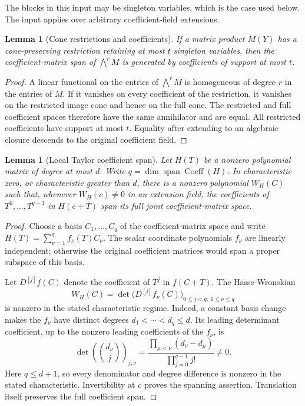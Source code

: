 \documentclass[11pt]{article}
\newtheorem{lemma}[theorem]{Lemma}
\begin{document}
The blocks in this input may be singleton variables, which is the case
used below. The input applies over arbitrary coefficient-field
extensions.

\begin{lemma}[Cone restrictions and coefficients]\label{lem:cone}
If a matrix product $M(Y)$ has a cone-preserving restriction retaining
at most $t$ singleton variables, then the coefficient-matrix span of
$\bigwedge^r M$ is generated by coefficients of support at most $t$.
\end{lemma}
\begin{proof}
A linear functional on the entries of $\bigwedge^r M$ is homogeneous
of degree $r$ in the entries of $M$. If it vanishes on every coefficient
of the restriction, it vanishes on the restricted image cone and hence
on the full cone. The restricted and full coefficient spaces therefore
have the same annihilator and are equal. All restricted coefficients
have support at most $t$. Equality after extending to an algebraic
closure descends to the original coefficient field.
\end{proof}

\begin{lemma}[Local Taylor coefficient span]\label{lem:jets}
Let $H(T)$ be a nonzero polynomial matrix of degree at most $d$.
Write $q=\dim\operatorname{span}\operatorname{Coeff}(H)$.
In characteristic zero, or characteristic greater than $d$, there is
a nonzero polynomial $W_H(C)$ such that, whenever $W_H(c)\ne0$
in an extension field,
the coefficients of $T^0,\ldots,T^{q-1}$ in $H(c+T)$ span its full
joint coefficient-matrix space.
\end{lemma}
\begin{proof}
Choose a basis $C_1,\ldots,C_q$ of the coefficient-matrix space and
write $H(T)=\sum_{\nu=1}^q f_\nu(T)C_\nu$. The scalar coordinate
polynomials $f_\nu$ are linearly independent; otherwise the original
coefficient matrices would span a proper subspace of this basis.

Let $D^{[j]}f(C)$ denote the coefficient of $T^j$ in $f(C+T)$.
The Hasse-Wronskian
\[
 W_H(C)=\det\bigl(D^{[j]}f_\nu(C)\bigr)_{
                  0\le j<q,\ 1\le\nu\le q}
\]
is nonzero in the stated characteristic regime. Indeed, a constant
basis change makes the $f_\nu$ have distinct degrees
$d_1<\cdots<d_q\le d$. Its leading determinant coefficient, up to
the nonzero leading coefficients of the $f_\nu$, is
\[
 \det\left(\binom{d_\nu}{j}\right)_{j,\nu}
   =\frac{\prod_{\mu<\nu}(d_\nu-d_\mu)}
          {\prod_{j=0}^{q-1}j!}\ne0.
\]
Here $q\le d+1$, so every denominator and degree difference is nonzero
in the stated characteristic. Invertibility at $c$ proves the spanning
assertion. Translation itself preserves the full coefficient span.
\end{proof}
\end{document}
